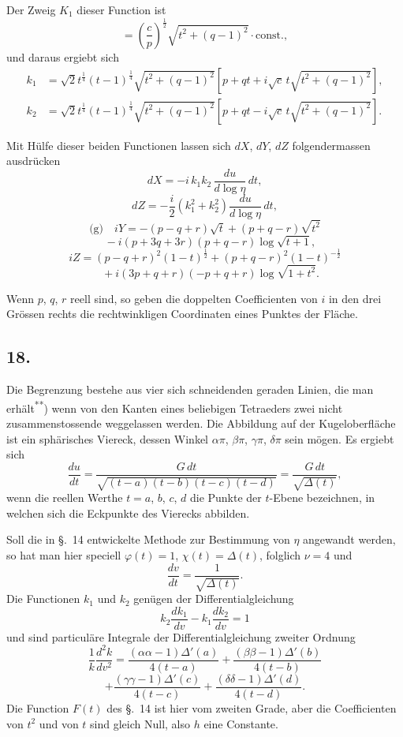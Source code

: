 \documentclass[12pt,a4paper]{article}
\begin{document}
Der Zweig $K_{1}$ dieser Function ist
\[= \left(\frac{c}{p}\right)^{\frac{1}{2}} \sqrt{t^{2} + (q-1)^{2}} \cdot \text{const.},\]
und daraus ergiebt sich
\[\begin{aligned}
k_{1} &= \sqrt{2} t^{\frac{1}{4}} (t-1)^{\frac{1}{4}} \sqrt{t^{2} + (q-1)^{2}} \left[p + qt + i\sqrt{c}\, t\sqrt{t^{2}+(q-1)^{2}}\right], \\
k_{2} &= \sqrt{2} t^{\frac{1}{4}} (t-1)^{\frac{1}{4}} \sqrt{t^{2} + (q-1)^{2}} \left[p + qt - i\sqrt{c}\, t\sqrt{t^{2}+(q-1)^{2}}\right].
\end{aligned}\]

Mit H\"ulfe dieser beiden Functionen lassen sich $dX$, $dY$, $dZ$ folgendermassen ausdr\"ucken
\[dX = -i\, k_{1}k_{2}\, \frac{du}{d\log\eta}\, dt,\]
\[dZ = -\frac{i}{2} (k_{1}^{2} + k_{2}^{2}) \frac{du}{d\log\eta}\, dt,\]
\[\text{(g)} \quad iY = -(p-q+r)\sqrt{t} + (p+q-r)\sqrt{t^{2}}\]
\[\quad - i(p+3q+3r)(p+q-r)\log\sqrt{t+1},\]
\[iZ = (p-q+r)^{2}(1-t)^{\frac{1}{2}} + (p+q-r)^{2}(1-t)^{-\frac{1}{2}}\]
\[\quad + i(3p+q+r)(-p+q+r)\log\sqrt{1+t^{2}}.\]

\newpage
Wenn $p$, $q$, $r$ reell sind, so geben die doppelten Coefficienten von $i$ in den drei Gr\"ossen rechts die rechtwinkligen Coordinaten eines Punktes der Fl\"ache.

\subsection*{18.}

Die Begrenzung bestehe aus vier sich schneidenden geraden Linien, die man erh\"alt\textsuperscript{**}) wenn von den Kanten eines beliebigen Tetraeders zwei nicht zusammenstossende weggelassen werden. Die Abbildung auf der Kugeloberfl\"ache ist ein sph\"arisches Viereck, dessen Winkel $\alpha\pi$, $\beta\pi$, $\gamma\pi$, $\delta\pi$ sein m\"ogen. Es ergiebt sich
\[\frac{du}{dt} = \frac{G\, dt}{\sqrt{(t-a)(t-b)(t-c)(t-d)}} = \frac{G\, dt}{\sqrt{\varDelta(t)}},\]
wenn die reellen Werthe $t = a$, $b$, $c$, $d$ die Punkte der $t$-Ebene bezeichnen, in welchen sich die Eckpunkte des Vierecks abbilden.

Soll die in \S.~14 entwickelte Methode zur Bestimmung von $\eta$ angewandt werden, so hat man hier speciell $\varphi(t) = 1$, $\chi(t) = \varDelta(t)$, folglich $\nu = 4$ und
\[\frac{dv}{dt} = \frac{1}{\sqrt{\varDelta(t)}}.\]
Die Functionen $k_{1}$ und $k_{2}$ gen\"ugen der Differentialgleichung
\[k_{2} \frac{dk_{1}}{dv} - k_{1} \frac{dk_{2}}{dv} = 1\]
und sind particul\"are Integrale der Differentialgleichung zweiter Ordnung
\[\frac{1}{k} \frac{d^{2}k}{dv^{2}} = \frac{(\alpha\alpha-1)\varDelta'(a)}{4(t-a)} + \frac{(\beta\beta-1)\varDelta'(b)}{4(t-b)}\]
\[+ \frac{(\gamma\gamma-1)\varDelta'(c)}{4(t-c)} + \frac{(\delta\delta-1)\varDelta'(d)}{4(t-d)}.\]
Die Function $F(t)$ des \S.~14 ist hier vom zweiten Grade, aber die Coefficienten von $t^{2}$ und von $t$ sind gleich Null, also $h$ eine Constante.
\end{document}
